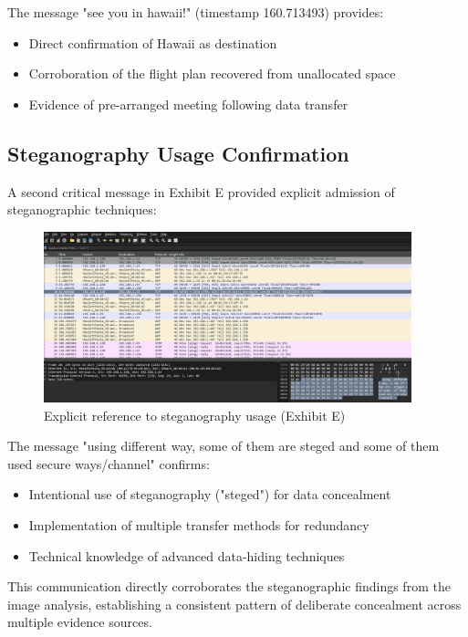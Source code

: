 The message "see you in hawaii!" (timestamp 160.713493) provides:
\begin{itemize}
    \item Direct confirmation of Hawaii as destination
    \item Corroboration of the flight plan recovered from unallocated space
    \item Evidence of pre-arranged meeting following data transfer
\end{itemize}

\subsection{Steganography Usage Confirmation}
A second critical message in Exhibit E provided explicit admission of steganographic techniques:

\begin{figure}[htbp]
    \centering
    \includegraphics[width=0.95\textwidth]{images/Network_Analysis/ExhibitE_pcap_steg.png}
    \caption{Explicit reference to steganography usage (Exhibit E)}
    \label{fig:exhibit_e_steg}
\end{figure}

The message "using different way, some of them are steged and some of them used secure ways/channel" confirms:
\begin{itemize}
    \item Intentional use of steganography ("steged") for data concealment
    \item Implementation of multiple transfer methods for redundancy
    \item Technical knowledge of advanced data-hiding techniques
\end{itemize}

This communication directly corroborates the steganographic findings from the image analysis, establishing a consistent pattern of deliberate concealment across multiple evidence sources.

